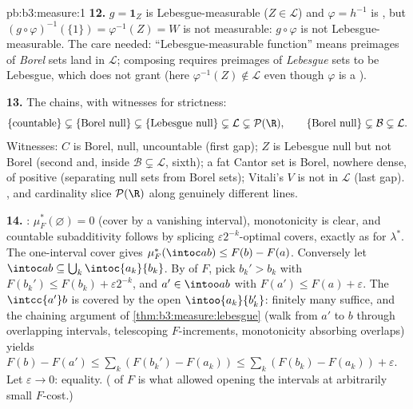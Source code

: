\begin{solution}{pb:b3:measure:1}
\textbf{12.} $g = \mathbf 1_Z$ is Lebesgue-measurable ($Z \in
\mathcal L$) and $\varphi = h^{-1}$ is , but
$(g\circ\varphi)^{-1}(\{1\}) = \varphi^{-1}(Z) = W$ is not
measurable: $g \circ \varphi$ is not Lebesgue-measurable. The
care needed: ``Lebesgue-measurable function'' means preimages
of \emph{Borel} sets land in $\mathcal L$; composing requires
preimages of \emph{Lebesgue} sets to be Lebesgue, which
 does not grant (here $\varphi^{-1}(Z) \notin
\mathcal L$ even though $\varphi$ is a ).

\textbf{13.} The chains, with witnesses for strictness:
\[
\{\text{countable}\} \subsetneq \{\text{Borel null}\}
\subsetneq \{\text{Lebesgue null}\} \subsetneq \mathcal L
\subsetneq \mathcal P(\R),
\qquad
\{\text{Borel null}\} \subsetneq \mathcal B \subsetneq
\mathcal L .
\]
Witnesses: $C$ is Borel, null, uncountable (first gap); $Z$ is
Lebesgue null but not Borel (second and, inside $\mathcal B
\subsetneq \mathcal L$, sixth); a fat Cantor set is Borel,
nowhere dense, of positive  (separating null sets from
Borel sets); Vitali's $V$ is not in $\mathcal L$ (last gap).
,  and cardinality slice $\mathcal P(\R)$ along
genuinely different lines.

\textbf{14.} : $\mu_F^*(\varnothing) = 0$ (cover
by a vanishing interval), monotonicity is clear, and countable
subadditivity follows by splicing $\varepsilon2^{-k}$-optimal
covers, exactly as for $\lambda^*$. The one-interval cover
gives $\mu_F^*(\intoc ab) \leq F(b) - F(a)$. Conversely let
$\intoc ab \subseteq \bigcup_k\intoc{a_k}{b_k}$. By 
of $F$, pick $b_k' > b_k$ with $F(b_k') \leq F(b_k) +
\varepsilon2^{-k}$, and $a' \in \intoo ab$ with $F(a') \leq
F(a) + \varepsilon$. The  $\intcc{a'}b$ is covered by
the open $\intoo{a_k}{b_k'}$: finitely many suffice, and the
chaining argument of \cref{thm:b3:measure:lebesgue} (walk from
$a'$ to $b$ through overlapping intervals, telescoping
$F$-increments, monotonicity absorbing overlaps) yields $F(b)
- F(a') \leq \sum_k(F(b_k') - F(a_k)) \leq \sum_k(F(b_k) -
F(a_k)) + \varepsilon$. Let $\varepsilon \to 0$: equality.
( of $F$ is what allowed opening the intervals at
arbitrarily small $F$-cost.)


\end{solution}
